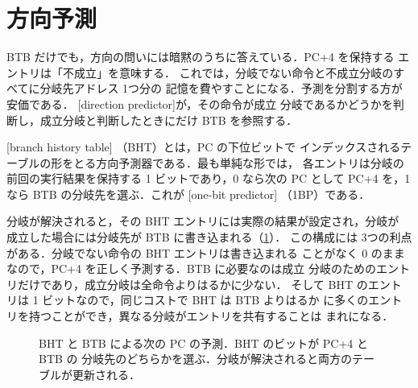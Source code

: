 \documentclass[../main.tex]{subfiles}
\begin{document}
\section{方向予測}
\label{sec:l04-direction}

BTB だけでも，方向の問いには暗黙のうちに答えている．PC+4 を保持する
エントリは「不成立」を意味する．%
これでは，分岐でない命令と不成立分岐のすべてに分岐先アドレス 1つ分の
記憶を費やすことになる．予測を分割する方が安価である．
[direction predictor]が，その命令が成立
分岐であるかどうかを判断し，成立分岐と判断したときにだけ BTB を参照する．

\begin{definition}[分岐履歴テーブル]
  [branch history table]%
  （BHT）とは，PC の下位ビットで
  インデックスされるテーブルの形をとる方向予測器である．最も単純な形では，
  各エントリは分岐の前回の実行結果を保持する 1 ビットであり，0 なら次の PC
  として PC+4 を，1 なら BTB の分岐先を選ぶ．これが
  [one-bit predictor]%
  （1BP）である．
\end{definition}

分岐が解決されると，その BHT エントリには実際の結果が設定され，分岐が
成立した場合には分岐先が BTB に書き込まれる（\cref{fig:l04-bht-btb}）．
この構成には 3つの利点がある．分岐でない命令の BHT エントリは書き込まれる
ことがなく 0 のままなので，PC+4 を正しく予測する．BTB に必要なのは成立
分岐のためのエントリだけであり，成立分岐は全命令よりはるかに少ない．
そして BHT のエントリは 1 ビットなので，同じコストで BHT は BTB よりはるか
に多くのエントリを持つことができ，異なる分岐がエントリを共有することは
まれになる．

\begin{figure}[htbp]
  \centering
  
  \caption{BHT と BTB による次の PC の予測．BHT のビットが PC+4 と BTB の
    分岐先のどちらかを選ぶ．分岐が解決されると両方のテーブルが更新される．}
  \label{fig:l04-bht-btb}
\end{figure}
\end{document}
